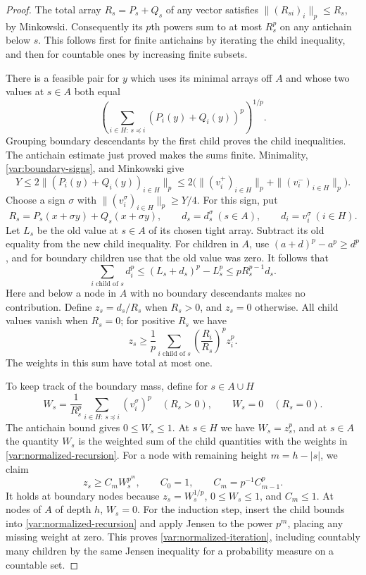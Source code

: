 \begin{proof}
The total array $R_s=P_s+Q_s$ of any vector satisfies
$\|(R_{si})_i\|_p\le R_s$, by Minkowski.  Consequently its $p$th
powers sum to at most $R_s^p$ on any antichain below $s$.
This follows first for finite antichains by iterating the child
inequality, and then for countable ones by increasing finite subsets.

There is a feasible pair for $y$ which uses its minimal arrays off
$A$ and whose two values at $s\in A$ both equal
\[
 \left(\sum_{i\in H:\,s\preceq i}
                  (P_i(y)+Q_i(y))^p\right)^{1/p}.
\]
Grouping boundary descendants by the first child proves the child
inequalities.  The antichain estimate just proved makes the sums
finite.  Minimality, \eqref{var:boundary-signs}, and Minkowski give
\[
 Y\le2\|(P_i(y)+Q_i(y))_{i\in H}\|_p
   \le2\bigl(\|(v_i^+)_{i\in H}\|_p+
                \|(v_i^-)_{i\in H}\|_p\bigr).
\]
Choose a sign $\sigma$ with $\|(v_i^\sigma)_{i\in H}\|_p\ge Y/4$.
For this sign, put
\[
 R_s=P_s(x+\sigma y)+Q_s(x+\sigma y),\qquad
 d_s=d_s^\sigma\ (s\in A),\qquad d_i=v_i^\sigma\ (i\in H).
\]
Let $L_s$ be the old value at $s\in A$ of its chosen tight array.
Subtract its old equality from the new child inequality.  For
children in $A$, use $(a+d)^p-a^p\ge d^p$, and for boundary children
use that the old value was zero.  It follows that
\[
 \sum_{i\text{ child of }s}d_i^p
 \le (L_s+d_s)^p-L_s^p
 \le pR_s^{p-1}d_s.
\]
Here and below a node in $A$ with no boundary descendants makes no
contribution.  Define $z_s=d_s/R_s$ when $R_s>0$, and $z_s=0$
otherwise.  All child values vanish when $R_s=0$; for positive $R_s$
we have
\begin{equation}\label{var:normalized-recursion}
 z_s\ge\frac1p\sum_{i\text{ child of }s}
             \left(\frac{R_i}{R_s}\right)^p z_i^p.
\end{equation}
The weights in this sum have total at most one.

To keep track of the boundary mass, define for $s\in A\cup H$
\[
 W_s=\frac{1}{R_s^p}
       \sum_{i\in H:\,s\preceq i}(v_i^\sigma)^p
 \quad(R_s>0),
 \qquad W_s=0\quad(R_s=0).
\]
The antichain bound gives $0\le W_s\le1$.  At $s\in H$ we have
$W_s=z_s^p$, and at $s\in A$ the quantity $W_s$ is the weighted sum
of the child quantities with the weights in
\eqref{var:normalized-recursion}.
For a node with remaining height $m=h-|s|$, we claim
\begin{equation}\label{var:normalized-iteration}
 z_s\ge C_m W_s^{p^m},\qquad
 C_0=1,\qquad C_m=p^{-1}C_{m-1}^p.
\end{equation}
It holds at boundary nodes because $z_s=W_s^{1/p}$,
$0\le W_s\le1$, and $C_m\le1$.  At nodes of $A$ of depth $h$,
$W_s=0$.
For the induction step, insert the child bounds into
\eqref{var:normalized-recursion} and apply Jensen to the power
$p^m$, placing any missing weight at zero.  This proves
\eqref{var:normalized-iteration}, including countably many children
by the same Jensen inequality for a probability measure on a
countable set.


\end{proof}
